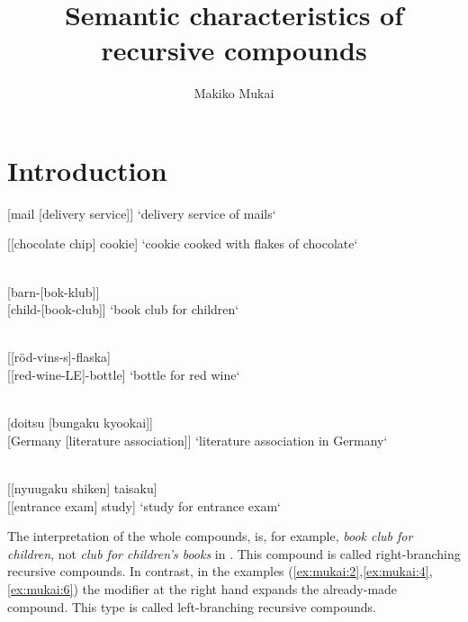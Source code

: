 \documentclass[output=paper]{LSP/langsci}
\author{Makiko Mukai \affiliation{University of Kochi}}
\title{Semantic characteristics of recursive compounds}
\begin{document}
\section{Introduction}




\ea%
\label{ex:mukai:1}
{[mail [delivery service]]   }  
\glt‘delivery service of mails‘
\z



\ea%
\label{ex:mukai:2}
{[[chocolate chip] cookie] }
\glt‘cookie cooked with flakes of chocolate‘ 
\z


\ea%
\\\label{ex:mukai:3}
{[barn-[bok-klub]] }    \\{}
[child-[book-club]]                      
\glt‘book club for children‘ 
\z


\newpage 
\ea%
\\\label{ex:mukai:4}
{[[röd-vins-s]-flaska]}  \\{}
[[red-wine-LE]-bottle] 
\glt‘bottle for red wine‘

 \z

\ea%
\label{ex:mukai:5}
\\
{[doitsu [bungaku kyookai]] }     \\{}
[Germany [literature association]] 
\glt‘literature association in Germany‘ 
\z

\ea%
\\\label{ex:mukai:6}
{[[nyuugaku shiken] taisaku] }    \\{}
[[entrance exam] study]    
\glt‘study for entrance exam‘
\z


The interpretation of the whole compounds, is, for example,\textit{ book club for children}, not \textit{club for children’s books} in . This  compound is called right-branching recursive compounds. In contrast, in the examples (\ref{ex:mukai:2},\ref{ex:mukai:4},\ref{ex:mukai:6}) the modifier at the right hand expands the already-made compound. This type is called left-branching recursive compounds. 
\end{document}

